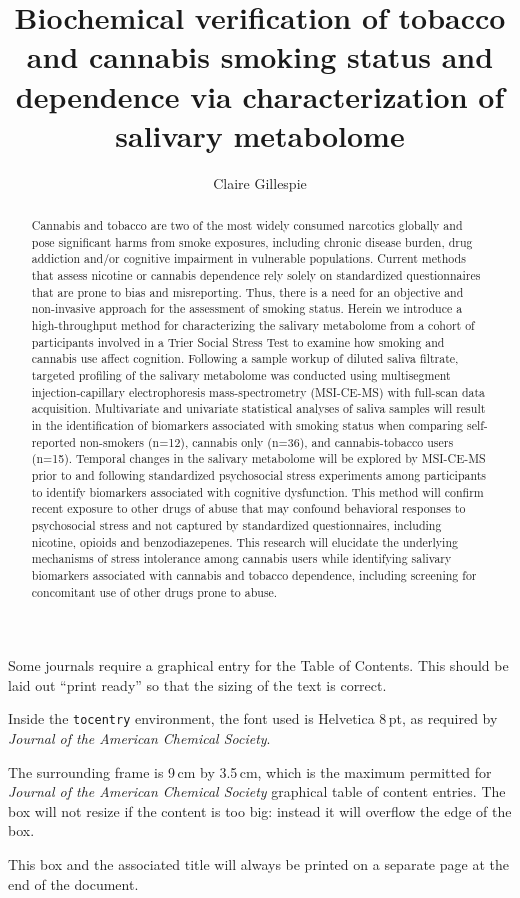 \documentclass[journal=jacsat,manuscript=article]{achemso}
\author{Claire Gillespie}
\affiliation{Department of Chemistry and Chemical Biology, McMaster
University, 1280 Main Street West, Hamilton, ON, L8S 4L8}
\title[An \textsf{achemso} demo]{Biochemical verification of tobacco and
cannabis smoking status and dependence via characterization of salivary
metabolome}
\begin{document}
\begin{abstract}
Cannabis and tobacco are two of the most widely consumed narcotics
globally and pose significant harms from smoke exposures, including
chronic disease burden, drug addiction and/or cognitive impairment in
vulnerable populations. Current methods that assess nicotine or cannabis
dependence rely solely on standardized questionnaires that are prone to
bias and misreporting. Thus, there is a need for an objective and
non-invasive approach for the assessment of smoking status. Herein we
introduce a high-throughput method for characterizing the salivary
metabolome from a cohort of participants involved in a Trier Social
Stress Test to examine how smoking and cannabis use affect cognition.
Following a sample workup of diluted saliva filtrate, targeted profiling
of the salivary metabolome was conducted using multisegment
injection-capillary electrophoresis mass-spectrometry (MSI-CE-MS) with
full-scan data acquisition. Multivariate and univariate statistical
analyses of saliva samples will result in the identification of
biomarkers associated with smoking status when comparing self-reported
non-smokers (n=12), cannabis only (n=36), and cannabis-tobacco users
(n=15). Temporal changes in the salivary metabolome will be explored by
MSI-CE-MS prior to and following standardized psychosocial stress
experiments among participants to identify biomarkers associated with
cognitive dysfunction. This method will confirm recent exposure to other
drugs of abuse that may confound behavioral responses to psychosocial
stress and not captured by standardized questionnaires, including
nicotine, opioids and benzodiazepenes. This research will elucidate the
underlying mechanisms of stress intolerance among cannabis users while
identifying salivary biomarkers associated with cannabis and tobacco
dependence, including screening for concomitant use of other drugs prone
to abuse.
\end{abstract}
\begin{tocentry}
Some journals require a graphical entry for the Table of Contents.
This should be laid out ``print ready'' so that the sizing of the
text is correct.

Inside the \texttt{tocentry} environment, the font used is Helvetica
8\,pt, as required by \emph{Journal of the American Chemical
Society}.

The surrounding frame is 9\,cm by 3.5\,cm, which is the maximum
permitted for  \emph{Journal of the American Chemical Society}
graphical table of content entries. The box will not resize if the
content is too big: instead it will overflow the edge of the box.

This box and the associated title will always be printed on a
separate page at the end of the document.
\end{tocentry}
\end{document}
